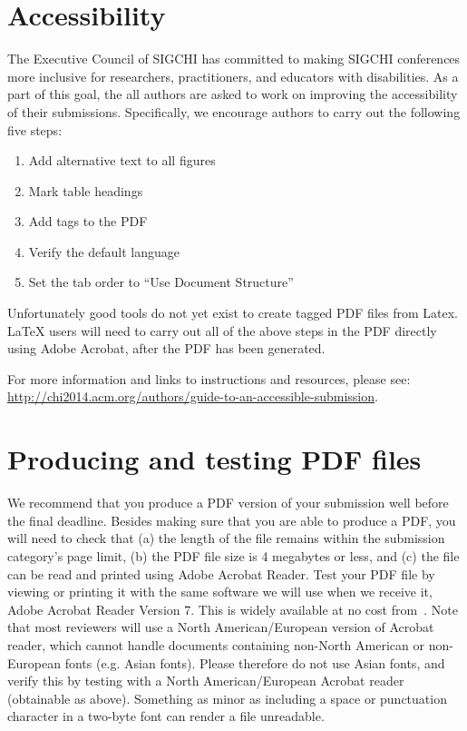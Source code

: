 \documentclass{chi-ext}
\begin{document}
\section{Accessibility}
The Executive Council of SIGCHI has committed to making SIGCHI conferences more inclusive for researchers, practitioners, and educators with disabilities. As a part of this goal, the all authors are asked to work on improving the accessibility of their submissions. Specifically, we encourage authors to carry out the following five steps:
\begin{enumerate}
        \item Add alternative text to all figures
        \item Mark table headings
        \item Add tags to the PDF
        \item Verify the default language
        \item Set the tab order to ``Use Document Structure''
\end{enumerate}
Unfortunately good tools do not yet exist to create tagged PDF files from Latex. LaTeX users will need to carry out all of the above steps in the PDF directly using Adobe Acrobat, after the PDF has been generated.
 
For more information and links to instructions and resources, please see:
{\url{http://chi2014.acm.org/authors/guide-to-an-accessible-submission}}.

\section{Producing and testing PDF files}
We recommend that you produce a PDF version of your submission well before the final deadline. 
Besides making sure that you are able to produce a PDF, you will need to check that (a) the length of the file remains within the submission category's page limit, (b) the PDF file size is 4 megabytes or less, and (c) the file can be read and printed using Adobe Acrobat Reader. 
Test your PDF file by viewing or printing it with the same software we will use when we receive it, Adobe Acrobat Reader Version 7. 
This is widely available at no cost from~\cite{Acrobat7}.  
Note that most reviewers will use a North American/European version of Acrobat reader, which cannot handle documents containing non-North American or non-European fonts (e.g. Asian fonts).  
Please therefore do not use Asian fonts, and verify this by testing with a North American/European Acrobat reader (obtainable as above). Something as minor as including a space or punctuation character in a two-byte font can render a file unreadable.
\end{document}
